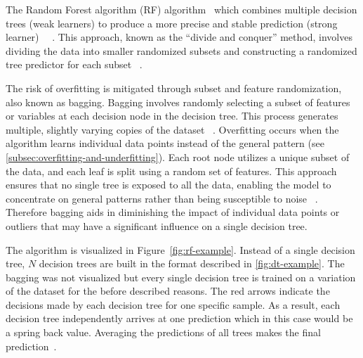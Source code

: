 The Random Forest algorithm
(\ac{RF}) algorithm~\cite[]{breiman_randomforests_2001} which combines multiple decision trees (weak learners) to
produce a more precise and stable prediction (strong learner)
~\cite[p. 24]{awad_efficientlearningmachines_2015}~\cite[pp. 340]{gareth2013introduction}.
This approach, known as the ``divide and conquer'' method, involves dividing the data into smaller randomized subsets
and constructing a randomized tree predictor for each subset
~\cite[p. 251]{liu_newmachinelearning_2012}.

The risk of overfitting is mitigated through subset and feature randomization, also known as bagging.
Bagging involves randomly selecting a subset of features or variables at each decision node in the decision
tree.
This process generates multiple, slightly varying copies of the dataset
~\cite[p. 341]{gareth2013introduction}.
Overfitting occurs when the algorithm learns individual data points instead of
the general pattern (see \cref{subsec:overfitting-and-underfitting}).
Each root node utilizes a unique subset of the data, and each leaf is split using a random set of features.
This approach ensures that no single tree is exposed to all the data, enabling the model to concentrate on general
patterns rather than being susceptible to noise
~\cite[p. 83]{muller_introductionmachinelearning_2016}.
Therefore bagging aids in diminishing the impact of individual data points or outliers that may have a
significant influence on a single decision tree.

The algorithm is visualized in Figure~\ref{fig:rf-example}.
Instead of a single decision tree, $N$ decision trees are built in the format described in \cref{fig:dt-example}.
The bagging was not visualized but every single decision tree is trained on a variation of the dataset for the before
described reasons.
The red arrows indicate the decisions made by each decision tree for one specific sample.
As a result, each decision tree independently arrives at one prediction which in this case would be a spring back value.
Averaging the predictions of all trees makes the final prediction~\cite[p. 9]{breiman_randomforests_2001}.

